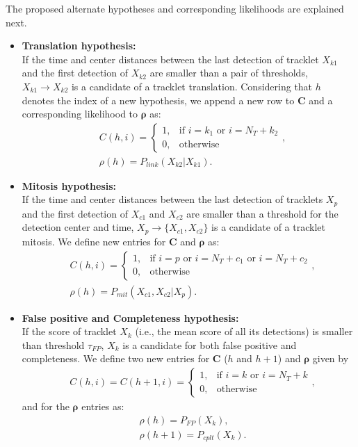 \documentclass{article}
\begin{document}
The proposed alternate hypotheses and corresponding likelihoods are explained next.
\begin{itemize}
    \item \textbf{Translation hypothesis:}\\
    If the time and center distances between the last detection of tracklet $X_{k1}$ and the first detection of $X_{k2}$ are smaller than a pair of thresholds, $X_{k1}\rightarrow X_{k2}$ is a candidate of a tracklet translation. Considering that $h$ denotes the index of a new hypothesis, we append a new row to $\bm{C}$ and a corresponding likelihood to $\bm{\rho}$ as:
    \begin{align*}
        &C(h,i) = 
        \begin{cases}
          1,&\text{if $i=k_1$ or $i=N_T+k_2$}\\
          0,&\text{otherwise}
        \end{cases}, \\
        &\rho (h) = P_{link}(X_{k2}|X_{k1}).
    \end{align*}
    
    \item \textbf{Mitosis hypothesis:}\\
    If the time and center distances between the last detection of tracklets $X_{p}$ and the first detection of $X_{c1}$ and $X_{c2}$ are smaller than a threshold for the detection center and time, $X_{p}\rightarrow \{X_{c1},X_{c2}\}$ is a candidate of a tracklet mitosis. We define new entries for $\bm{C}$ and $\bm{\rho}$ as:
    \begin{align*}
        &C(h,i) = 
        \begin{cases}
          1,&\text{if $i=p$ or $i=N_T+c_1$ or $i=N_T+c_2$}\\
          0,&\text{otherwise}
        \end{cases}, \\
        &\rho (h) = P_{mit}(X_{c1},X_{c2}|X_p).
    \end{align*}
    
    \item \textbf{False positive and Completeness hypothesis:}\\
    If the score of tracklet $X_k$ (i.e., the mean score of all its detections) is smaller than threshold $\tau_{FP}$, $X_k$ is a candidate for both false positive and completeness. We define two new entries for $\bm{C}$ ($h$ and $h+1$) and $\bm{\rho}$ given by
    \begin{align*}
        &C(h,i) = C(h+1,i) = 
        \begin{cases}
          1,&\text{if $i=k$ or $i=N_T+k$}\\
          0,&\text{otherwise}
        \end{cases},
    \end{align*}
    and for the $\bm{\rho}$ entries as:
    \begin{align*}
        &\rho (h) = P_{FP}(X_k),\\
        &\rho (h+1) = P_{cplt}(X_k).
    \end{align*}
    

\end{itemize}
\end{document}
